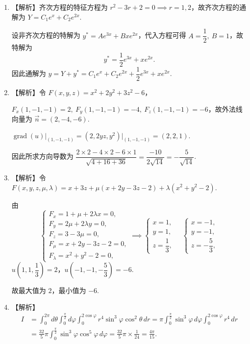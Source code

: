 \documentclass[a4paper,11pt]{ctexart}
\newcommand{\grad}{\operatorname{grad}}
\begin{document}
\begin{enumerate}[label=\arabic*., start=11, leftmargin=2em, itemsep=0.9em, topsep=0.6em]
  \item 【解析】齐次方程的特征方程为 $r^2 - 3r + 2 = 0 \implies r = 1, 2$，故齐次方程的通解为 $Y = C_1 e^x + C_2 e^{2x}$.

  设非齐次方程的特解为 $y^* = Ae^{3x} + Bxe^{2x}$，代入方程可得 $A = \dfrac{1}{2},\ B = 1$，故特解为
  \[
    y^* = \frac{1}{2}e^{3x} + xe^{2x}.
  \]
  因此通解为 $y = Y + y^* = C_1 e^x + C_2 e^{2x} + \dfrac{1}{2}e^{3x} + xe^{2x}$.

  \item 【解析】令 $F(x,y,z) = x^2 + 2y^2 + 3z^2 - 6$，

  $F_x(1,-1,-1) = 2,\ F_y(1,-1,-1) = -4,\ F_z(1,-1,-1) = -6$，故外法线向量为 $\vec{n} = (2,-4,-6)$.

  $\grad(u)\big|_{(1,-1,-1)} = (2, 2yz, y^2)\big|_{(1,-1,-1)} = (2, 2, 1)$.

  因此所求方向导数为 $\dfrac{2\times 2 - 4\times 2 - 6\times 1}{\sqrt{4 + 16 + 36}} = \dfrac{-10}{2\sqrt{14}} = -\dfrac{5}{\sqrt{14}}$.

  \item 【解析】令 $F(x,y,z,\mu,\lambda) = x + 3z + \mu(x + 2y - 3z - 2) + \lambda(x^2 + y^2 - 2)$.

  由
  \[
    \begin{cases}
      F_x = 1 + \mu + 2\lambda x = 0, \\
      F_y = 2\mu + 2\lambda y = 0, \\
      F_z = 3 - 3\mu = 0, \\
      F_\mu = x + 2y - 3z - 2 = 0, \\
      F_\lambda = x^2 + y^2 - 2 = 0,
    \end{cases}
    \implies
    \begin{cases}
      x = 1, \\
      y = 1, \\
      z = \dfrac{1}{3},
    \end{cases}
    \quad
    \begin{cases}
      x = -1, \\
      y = -1, \\
      z = -\dfrac{5}{3},
    \end{cases}
  \]
  $u\left(1,1,\dfrac{1}{3}\right) = 2$，$u\left(-1,-1,-\dfrac{5}{3}\right) = -6$.

  故最大值为 $2$，最小值为 $-6$.

  \item 【解析】
  \begin{align*}
    I &= \int_0^{2\pi} d\theta \int_0^{\frac{\pi}{2}} d\varphi \int_0^{2\cos\varphi} r^4\sin^3\varphi\cos^2\theta\,dr = \pi \int_0^{\frac{\pi}{2}} \sin^3\varphi\,d\varphi \int_0^{2\cos\varphi} r^4\,dr \\
      &= \frac{32}{5}\pi \int_0^{\frac{\pi}{2}} \sin^3\varphi\cos^5\varphi\,d\varphi = \frac{32}{5}\pi \times \frac{1}{24} = \frac{4\pi}{15}.
  \end{align*}


\end{enumerate}
\end{document}
